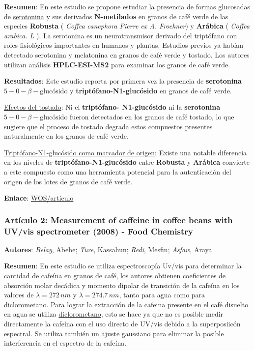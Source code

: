 \documentclass{article}
\begin{document}
\textbf{Resumen}:  En este estudio se propone estudiar la presencia de formas glucosadas de \underline{serotonina} y sus derivados \textbf{N-metilados} en granos de café verde de las especies \textbf{Robusta} ( \textit{Coffea canephora Pierre ex A. Froehner}) y \textbf{Arábica} (\textit{ Coffea arabica. L }). La serotonina es un neurotransmisor derivado del triptófano con roles fisiológicos importantes en humanos y plantas. Estudios previos ya habían detectado serotonina y melatonina en granos de café verde y tostado.  Los autores utilizan análisis \textbf{HPLC-ESI-MS2} para examinar los granos de café verde. \vspace{0.5cm}

\textbf{Resultados}: Este estudio reporta por primera vez la presencia de \textbf{serotonina $5-0-\beta-\text{glucósido}$} y \textbf{triptófano-N1-glucósido} en granos de café verde. \vspace{0.5cm}

\underline{Efectos del tostado}: Ni el \textbf{triptófano- N1-glucósido} ni la \textbf{serotonina $5-0-\beta-\text{glucósido}$}  fueron detectados en los granos de café tostado, lo que sugiere que el proceso de tostado degrada estos compuestos presentes naturalmente en los granos de café verde.

\underline{Triptófano-N1-glucósido como marcador de origen}: Existe una notable diferencia en los niveles de \textbf{triptófano-N1-glucósido} entre \textbf{Robusta} y \textbf{Arábica} convierte a este compuesto como una herramienta potencial para la autenticación del origen de los lotes de granos de café verde. \vspace{0.5cm}

\textbf{Enlace}: \href{https://webofscience.bibliotecabuap.elogim.com/wos/woscc/full-record/WOS:000381321100018}{WOS/artículo} \vspace{0.5cm}

\subsubsection{\textbf{Artículo 2:} \textcolor{trueblue}{\textbf{Measurement of caffeine in coffee beans with UV/vis spectrometer (2008) - Food Chemistry}}} \vspace{0.5cm}

\textbf{Autores}: \textit{Belay}, Abebe; \textit{Ture}, Kassahun; \textit{Redi}, Mesfin; \textit{Asfaw}, Araya. \vspace{0.5cm}


\textbf{Resumen}: En este estudio se utiliza espectroscopía Uv/vis para determinar la cantidad de cafeína en granos de café, los autores obtienen coeficientes de absorción molar decádica y momento dipolar de transición de la cafeína en los valores de $\lambda = 272 \, nm$ y $\lambda = 274.7 \, nm$, tanto para agua como para \underline{diclorometano}. Para lograr la extracción de la cafeina presente en el café disuelto en agua se utiliza \underline{diclorometano}, esto se hace ya que no es posible medir directamente la cafeína con el uso directo de UV/vis debido a la superposiicón espectral. Se utiliza también un \underline{ajuste gaussiano} para eliminar la posible interferencia en el espectro de la cafeína. \vspace{0.5cm}
\end{document}

